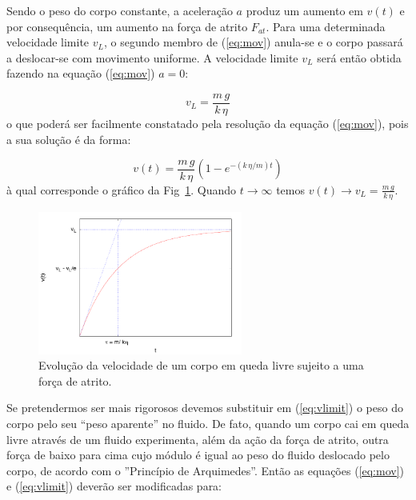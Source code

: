 \documentclass[a4paper,twoside,12pt]{article}      %
\begin{document}
Sendo o peso do corpo constante, a aceleração $a$ produz um aumento  em $v(t)$ e por consequência, um aumento na força de atrito $F_{at}$. Para uma determinada velocidade limite $v_L$, o segundo membro de (\ref{eq:mov}) anula-se e o corpo passará a deslocar-se com movimento uniforme. A velocidade limite $v_L$ será então obtida fazendo na equação (\ref{eq:mov}) $a= 0$:

\begin{equation}
	\label{eq:vlimit}
	v_L = \frac{m\,g}{k  \, \eta}
\end{equation}
o que poderá ser facilmente constatado pela resolução da equação (\ref{eq:mov}), pois a sua solução é da forma:

\begin{equation}
	\label{eq:vlimita}
	v(t) = \frac{m\,g}{k  \, \eta} (1 - e^{- (k\,\eta / m) t})
\end{equation}
à qual corresponde o gráfico  da Fig~\ref{fig:vLim}. Quando $t \to \infty$ temos $v(t) \to v_L = \frac{m\,g}{k  \, \eta} $.



\begin{figure}[tb]
  \centering 
	\includegraphics[width=0.6\textwidth]{./plote}
	\caption{ Evolução da velocidade de um corpo em queda livre sujeito a uma força de atrito. \label{fig:vLim}} 
\end{figure}


Se pretendermos ser mais rigorosos devemos substituir  em (\ref{eq:vlimit}) o peso do corpo pelo seu “peso aparente” no fluido. De fato, quando um corpo cai em queda livre através de um fluido experimenta, além da ação da força de atrito, outra força de baixo para cima cujo módulo é igual ao peso do fluido deslocado pelo corpo, de acordo com o ''Princípio de Arquimedes''. Então  as equações (\ref{eq:mov}) e (\ref{eq:vlimit}) deverão ser modificadas para:
\end{document}
